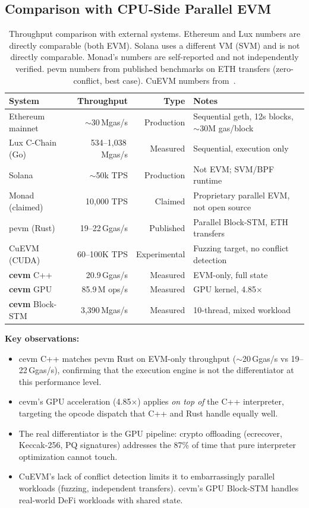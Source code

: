 \documentclass[11pt]{article}
\begin{document}
\subsection{Comparison with CPU-Side Parallel EVM}

\begin{table}[h]
\centering
\small
\begin{tabular}{lrrp{4cm}}
\toprule
\textbf{System} & \textbf{Throughput} & \textbf{Type} & \textbf{Notes} \\
\midrule
Ethereum mainnet    & $\sim$30\,Mgas/s     & Production & Sequential geth, 12s blocks, $\sim$30M gas/block \\
Lux C-Chain (Go)    & 534--1{,}038\,Mgas/s & Measured   & Sequential, execution only \\
Solana              & $\sim$50k TPS        & Production & Not EVM; SVM/BPF runtime \\
Monad (claimed)     & 10{,}000 TPS         & Claimed    & Proprietary parallel EVM, not open source \\
pevm (Rust)         & 19--22\,Ggas/s       & Published  & Parallel Block-STM, ETH transfers \\
CuEVM (CUDA)        & 60--100K TPS         & Experimental & Fuzzing target, no conflict detection \\
\midrule
\textbf{cevm} C++   & 20.9\,Ggas/s        & Measured   & EVM-only, full state \\
\textbf{cevm} GPU   & 85.9\,M ops/s       & Measured   & GPU kernel, 4.85$\times$ \\
\textbf{cevm} Block-STM & 3{,}390\,Mgas/s & Measured   & 10-thread, mixed workload \\
\bottomrule
\end{tabular}
\caption{Throughput comparison with external systems. Ethereum and Lux numbers are
directly comparable (both EVM). Solana uses a different VM (SVM) and is not directly
comparable. Monad's numbers are self-reported and not independently verified.
pevm numbers from published benchmarks on ETH transfers (zero-conflict, best case).
CuEVM numbers from~\cite{cuevm}.}
\label{tab:external}
\end{table}

\textbf{Key observations:}
\begin{itemize}
\item cevm C++ matches pevm Rust on EVM-only throughput ($\sim$20\,Ggas/s vs 19--22\,Ggas/s),
      confirming that the execution engine is not the differentiator at this performance level.
\item cevm's GPU acceleration (4.85$\times$) applies \emph{on top of} the C++ interpreter,
      targeting the opcode dispatch that C++ and Rust handle equally well.
\item The real differentiator is the GPU pipeline: crypto offloading (ecrecover, Keccak-256,
      PQ signatures) addresses the 87\% of time that pure interpreter optimization cannot touch.
\item CuEVM's lack of conflict detection limits it to embarrassingly parallel workloads
      (fuzzing, independent transfers). cevm's GPU Block-STM handles real-world DeFi workloads
      with shared state.
\end{itemize}
\end{document}
